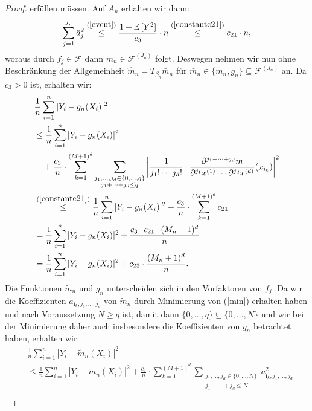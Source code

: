 \begin{proof}
erfüllen müssen.
Auf $A_n$ erhalten wir dann:
$$\sum_{j = 1}^{J_n}\hat{a}_j^2 \stackrel{(\ref{event})}{\leq} \frac{1 + \mathbb{E}\,[Y^2]}{c_3} \cdot n \stackrel{(\ref{constantc21})}{\leq} c_{21} \cdot n,$$
woraus durch $f_j \in \mathcal{F}$ dann $\tilde{m}_n \in \mathcal{F}^{(J_n)}$ folgt.
Deswegen nehmen wir nun ohne Beschränkung der Allgemeinheit $\hat{m}_n = T_{\beta_n}\bar{m}_n$ für $\bar{m}_n \in \{\tilde{m}_n, g_n\} \subseteq \mathcal{F}^{(J_n)}$ an.
Da $c_3 > 0$ ist, erhalten wir:
\begin{equation}
\begin{split}
\label{g}
& \frac{1}{n} \sum_{i = 1}^n|Y_i - g_n(X_i)|^2 \\
& \leq \frac{1}{n} \sum_{i = 1}^n|Y_i - g_n(X_i)|^2 \\
& \quad + \frac{c_3}{n} \cdot \sum_{k = 1}^{(M + 1)^d} \sum_{\substack{ j_1,\dots,j_d \in \{0,\dots,q\} \\j_1+\dots +j_d \leq q}} \bigg|\frac{1}{j_1! \cdots j_d!} \cdot \frac{\partial^{j_1+\cdots + j_d} m}{\partial^{j_1} x^{(1)}\cdots \partial^{j_d} x^{(d)}}(x_{\mathbf{i}_k})\bigg|^2 \\
& \stackrel{(\ref{constantc21})}{\leq} \frac{1}{n} \sum_{i = 1}^n|Y_i - g_n(X_i)|^2 +  \frac{c_3}{n} \cdot \sum_{k = 1}^{(M + 1)^d} c_{21} \\
& = \frac{1}{n} \sum_{i = 1}^n|Y_i - g_n(X_i)|^2 + \frac{c_3 \cdot c_{21} \cdot (M_n + 1)^d}{n} \\
& = \frac{1}{n} \sum_{i = 1}^n|Y_i - g_n(X_i)|^2 + c_{23} \cdot \frac{(M_n + 1)^d}{n}.
\end{split}
\end{equation}
Die Funktionen $\tilde{m}_n$ und $g_n$ unterscheiden sich in den Vorfaktoren von $f_j$. Da wir die Koeffizienten $a_{\mathbf{i}_k,j_1,\dots,j_d}$ von $\tilde{m}_n$ durch Minimierung von (\ref{min}) erhalten haben und nach Voraussetzung $N \geq q$ ist, damit dann $\{0,\dots,q\} \subseteq \{0,\dots,N\}$ und wir bei der Minimierung daher auch insbesondere die Koeffizienten von $g_n$ betrachtet haben, erhalten wir:
\begin{equation}
\begin{split}
\label{tilde}
& \frac{1}{n} \sum_{i = 1}^n|Y_i - \tilde{m}_n(X_i)|^2 \\
& \leq \frac{1}{n} \sum_{i = 1}^n|Y_i - \tilde{m}_n(X_i)|^2 + \frac{c_3}{n} \cdot \sum_{k = 1}^{(M + 1)^d} \sum_{\substack{ j_1,\dots,j_d \in \{0,\dots,N\} \\j_1+\dots +j_d \leq N}} a_{\mathbf{i}_k,j_1,\dots,j_d}^2 \\

\end{split}
\end{equation}
\end{proof}
